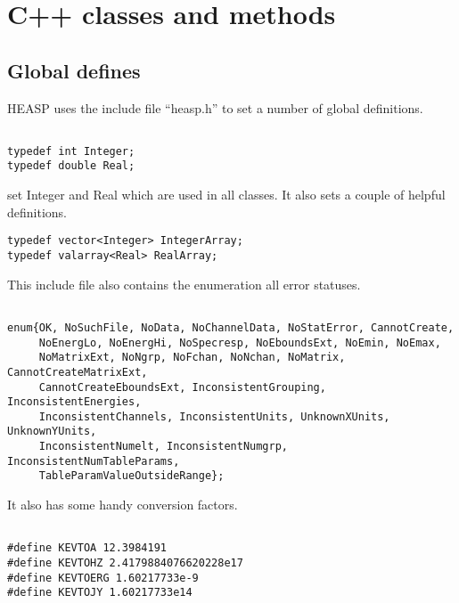 \documentclass[11pt]{book}
\begin{document}


\chapter{C++ classes and methods}

\section{Global defines}

HEASP uses the include file ``heasp.h'' to set a number of global
definitions.

\begin{verbatim}

typedef int Integer;
typedef double Real;

\end{verbatim}

set Integer and Real which are used in all classes. It also sets a
couple of helpful definitions.

\begin{verbatim}
typedef vector<Integer> IntegerArray;
typedef valarray<Real> RealArray;
\end{verbatim}

This include file also contains the enumeration all error statuses.

\begin{verbatim}

enum{OK, NoSuchFile, NoData, NoChannelData, NoStatError, CannotCreate,
     NoEnergLo, NoEnergHi, NoSpecresp, NoEboundsExt, NoEmin, NoEmax,
     NoMatrixExt, NoNgrp, NoFchan, NoNchan, NoMatrix, CannotCreateMatrixExt,
     CannotCreateEboundsExt, InconsistentGrouping, InconsistentEnergies,
     InconsistentChannels, InconsistentUnits, UnknownXUnits, UnknownYUnits,
     InconsistentNumelt, InconsistentNumgrp, InconsistentNumTableParams,
     TableParamValueOutsideRange};

\end{verbatim}

It also has some handy conversion factors.

\begin{verbatim}

#define KEVTOA 12.3984191
#define KEVTOHZ 2.4179884076620228e17
#define KEVTOERG 1.60217733e-9
#define KEVTOJY 1.60217733e14

\end{verbatim}
\end{document}
